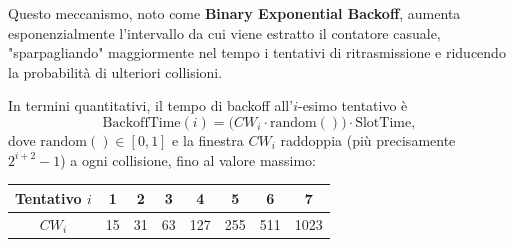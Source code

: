 Questo meccanismo, noto come \textbf{Binary Exponential Backoff}, aumenta esponenzialmente l'intervallo da cui viene estratto il contatore casuale, "sparpagliando" maggiormente nel tempo i tentativi di ritrasmissione e riducendo la probabilità di ulteriori collisioni.

In termini quantitativi, il tempo di backoff all'$i$-esimo tentativo è
$$ \text{BackoffTime}(i) = \big(CW_i \cdot \text{random}()\big) \cdot \text{SlotTime}, $$
dove $\text{random}() \in [0,1]$ e la finestra $CW_i$ raddoppia (più precisamente $2^{i+2}-1$) a ogni collisione, fino al valore massimo:

\begin{center}
\begin{tabular}{c|ccccccc}
    Tentativo $i$ & 1 & 2 & 3 & 4 & 5 & 6 & 7 \\
    \hline
    $CW_i$ & 15 & 31 & 63 & 127 & 255 & 511 & 1023 \\
\end{tabular}
\end{center}

